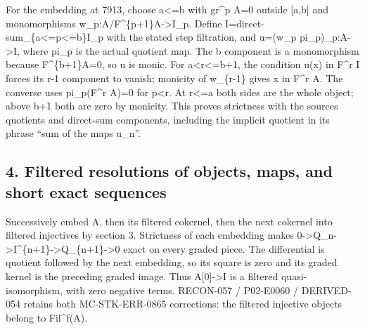 \documentclass[11pt]{article}
\begin{document}
For the embedding at 7913,\allowbreak{} choose a<\allowbreak{}=b with gr\^{}p A\allowbreak{}=0 outside [a,\allowbreak{}b]\allowbreak{} and monomorphisms w\_\allowbreak{}p:\allowbreak{}A/\allowbreak{}F\textasciicircum{}\{p\allowbreak{}+1\}A\allowbreak{}->I\_\allowbreak{}p. Define I\allowbreak{}=direct-sum\_\allowbreak{}\{a<\allowbreak{}=p<\allowbreak{}=b\}I\_\allowbreak{}p with the stated step filtration,\allowbreak{} and u\allowbreak{}=(w\_\allowbreak{}p pi\_\allowbreak{}p)\allowbreak{}\_\allowbreak{}p:\allowbreak{}A\allowbreak{}->I,\allowbreak{} where pi\_\allowbreak{}p is the actual quotient map. The b component is a monomorphism because F\textasciicircum{}\{b\allowbreak{}+1\}A\allowbreak{}=0,\allowbreak{} so u is monic. For a<r<\allowbreak{}=b\allowbreak{}+1,\allowbreak{} the condition u(x)\allowbreak{} in F\^{}r I forces its r-1 component to vanish; monicity of w\_\allowbreak{}\{r-1\} gives x in F\^{}r A. The converse uses pi\_\allowbreak{}p(F\textasciicircum{}r A)\allowbreak{}\allowbreak{}=0 for p\textless r. At r<\allowbreak{}=a both sides are the whole object; above b\allowbreak{}+1 both are zero by monicity. This proves strictness with the source\textquotesingle s quotients and direct-sum components,\allowbreak{} including the implicit quotient in its phrase ``sum of the maps u\_\allowbreak{}n”.

\subsection{\texorpdfstring{4. Filtered resolutions of objects,\allowbreak{} maps,\allowbreak{} and short exact sequences}{4. Filtered resolutions of   and short exact sequences}}\label{proofs-7589-8350-filtered-resolutions-of-objects-maps-and-short-exact-sequences}

Successively embed A,\allowbreak{} then its filtered cokernel,\allowbreak{} then the next cokernel into filtered injectives by section 3. Strictness of each embedding makes 0\allowbreak{}->Q\_\allowbreak{}n\allowbreak{}->I\textasciicircum{}\{n\allowbreak{}+1\}\allowbreak{}->Q\_\allowbreak{}\{n\allowbreak{}+1\}\allowbreak{}->0 exact on every graded piece. The differential is quotient followed by the next embedding,\allowbreak{} so its square is zero and its graded kernel is the preceding graded image. Thus A[0]\allowbreak{}\allowbreak{}->I is a filtered quasi-isomorphism,\allowbreak{} with zero negative terms. RECON-057 /\allowbreak{} P02-E0060 /\allowbreak{} DERIVED-054 retains both MC-STK-ERR-0865 corrections:\allowbreak{} the filtered injective objects belong to Fil\textasciicircum{}f(A)\allowbreak{}.
\end{document}

